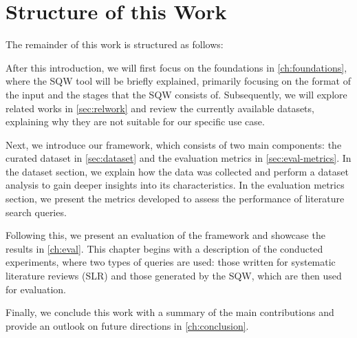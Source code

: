 \section{Structure of this Work}\label{sec:structure}
The remainder of this work is structured as follows:

After this introduction, we will first focus on the foundations in \autoref{ch:foundations}, where the SQW tool will be briefly explained, primarily focusing on the format of the input and the stages that the SQW consists of. Subsequently, we will explore related works in \autoref{sec:relwork} and review the currently available datasets, explaining why they are not suitable for our specific use case.

Next, we introduce our framework, which consists of two main components: the curated dataset in \autoref{sec:dataset} and the evaluation metrics in \autoref{sec:eval-metrics}. In the dataset section, we explain how the data was collected and perform a dataset analysis to gain deeper insights into its characteristics. In the evaluation metrics section, we present the metrics developed to assess the performance of literature search queries.

Following this, we present an evaluation of the framework and showcase the results in \autoref{ch:eval}. This chapter begins with a description of the conducted experiments, where two types of queries are used: those written for systematic literature reviews (SLR) and those generated by the SQW, which are then used for evaluation.

Finally, we conclude this work with a summary of the main contributions and provide an outlook on future directions in \autoref{ch:conclusion}.


